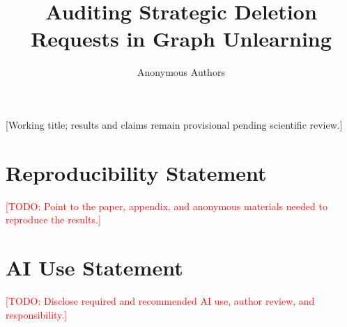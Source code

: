 \documentclass[sigconf,anonymous,review]{acmart}
\title{Auditing Strategic Deletion Requests in Graph Unlearning}
\author{Anonymous Authors}
\newcommand{\todo}[1]{\textcolor{red}{[TODO: #1]}}
\newcommand{\draftnote}[1]{\textcolor{blue!70!black}{[#1]}}
\begin{document}

% 
\maketitle
\draftnote{Working title; results and claims remain provisional pending scientific review.}











\section*{Reproducibility Statement}
\todo{Point to the paper, appendix, and anonymous materials needed to reproduce the results.}

\section*{AI Use Statement}
\todo{Disclose required and recommended AI use, author review, and responsibility.}




\appendix

\end{document}
